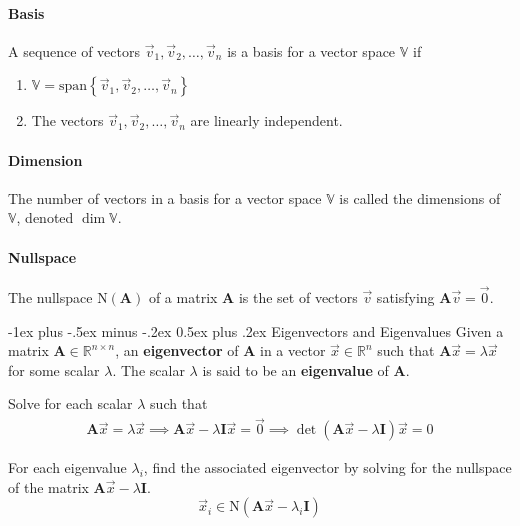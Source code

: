 \documentclass[10pt,landscape,letterpaper]{article}
\makeatletter
\renewcommand{\section}{\@startsection{section}{1}{0mm}%
                                {-1ex plus -.5ex minus -.2ex}%
                                {0.5ex plus .2ex}%
                                {\normalfont\large\bfseries}}
\newcommand{\matr}[1]{\mathbf{#1}}
\newcommand{\vecspace}[1]{\mathbb{#1}}
\newcommand\cheatsheetmargin{0.2cm}
\makeatother
\begin{document}
\begin{multicols}{3}
\paragraph{Basis}
A sequence of vectors $\vec{v}_1, \vec{v}_2, \ldots, \vec{v}_n$ is a basis for a vector space $\vecspace{V}$ if
\begin{enumerate}[noitemsep]
    \item $\vecspace{V}= \mathrm{span}\left\{\vec{v}_1, \vec{v}_2, \ldots, \vec{v}_n\right\}$
    \item The vectors $\vec{v}_1, \vec{v}_2, \ldots, \vec{v}_n$ are linearly independent.
\end{enumerate}

\paragraph{Dimension} The number of vectors in a basis for a vector space $\vecspace{V}$ is called the dimensions of $\vecspace{V}$, denoted $\dim \vecspace{V}$.

\paragraph{Nullspace}
The nullspace $\mathrm{N}(\matr{A})$ of a matrix $\matr{A}$ is the set of vectors $\vec{v}$ satisfying $\matr{A}\vec{v} = \vec{0}$.

\section{Eigenvectors and Eigenvalues}
Given a matrix $\matr{A}\in\vecspace{R}^{n\times n}$, an \textbf{eigenvector} of $\matr{A}$ in a vector $\vec{x}\in\vecspace{R}^n$ such that $\matr{A}\vec{x} = \lambda\vec{x}$ for some scalar $\lambda$. The scalar $\lambda$ is said to be an \textbf{eigenvalue} of $\matr{A}$.
\begin{description}[style=unboxed,leftmargin=\cheatsheetmargin+0.2cm, topsep=0.2cm]
    \item[Computing Eigenvalues]
        Solve for each scalar $\lambda$ such that
        \begin{gather*}
            \matr{A}\vec{x} = \lambda\vec{x} \implies \matr{A}\vec{x} - \lambda \matr{I}\vec{x} = \vec{0} \implies \boxed{\det \left( \matr{A}\vec{x} - \lambda \matr{I}\right)\vec{x} = 0}
        \end{gather*}
        
        For each eigenvalue $\lambda_i$, find the associated eigenvector by solving for the nullspace of the matrix $\matr{A}\vec{x} - \lambda \matr{I}$.
        \begin{equation*}
            \vec{x}_i \in \mathrm{N}(\matr{A}\vec{x} - \lambda_i \matr{I})
        \end{equation*}
    

\end{description}
\end{multicols}
\end{document}

